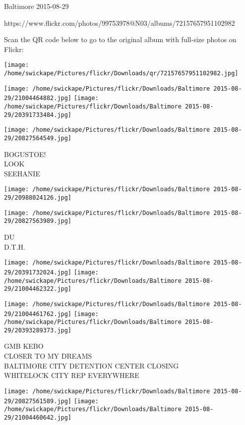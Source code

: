 \documentclass[10pt,letterpaper]{article}
\begin{document}
Baltimore 2015-08-29

https://www.flickr.com/photos/99753978@N03/albums/72157657951102982

Scan the QR code below to go to the original album with full-size photos on Flickr:

\texttt{[image: /home/swickape/Pictures/flickr/Downloads/qr/72157657951102982.jpg]}
\pagebreak

\texttt{[image: /home/swickape/Pictures/flickr/Downloads/Baltimore 2015-08-29/21004464882.jpg]}
\texttt{[image: /home/swickape/Pictures/flickr/Downloads/Baltimore 2015-08-29/20391733484.jpg]}

\vspace{0.25in}
\texttt{[image: /home/swickape/Pictures/flickr/Downloads/Baltimore 2015-08-29/20827564549.jpg]}

BOGUSTOE!\\
LOOK\\
SEEHANIE\\
\pagebreak

\texttt{[image: /home/swickape/Pictures/flickr/Downloads/Baltimore 2015-08-29/20988024126.jpg]}

\vspace{0.25in}
\texttt{[image: /home/swickape/Pictures/flickr/Downloads/Baltimore 2015-08-29/20827563989.jpg]}

DU\\
D.T.H.\\
\pagebreak

\texttt{[image: /home/swickape/Pictures/flickr/Downloads/Baltimore 2015-08-29/20391732024.jpg]}
\texttt{[image: /home/swickape/Pictures/flickr/Downloads/Baltimore 2015-08-29/21004462322.jpg]}

\texttt{[image: /home/swickape/Pictures/flickr/Downloads/Baltimore 2015-08-29/21004461762.jpg]}
\texttt{[image: /home/swickape/Pictures/flickr/Downloads/Baltimore 2015-08-29/20393289373.jpg]}

GMB KEBO\\
CLOSER TO MY DREAMS\\
BALTIMORE CITY DETENTION CENTER CLOSING\\
WHITELOCK CITY REP EVERYWHERE\\
\pagebreak

\texttt{[image: /home/swickape/Pictures/flickr/Downloads/Baltimore 2015-08-29/20827561589.jpg]}
\texttt{[image: /home/swickape/Pictures/flickr/Downloads/Baltimore 2015-08-29/21004460642.jpg]}
\end{document}
